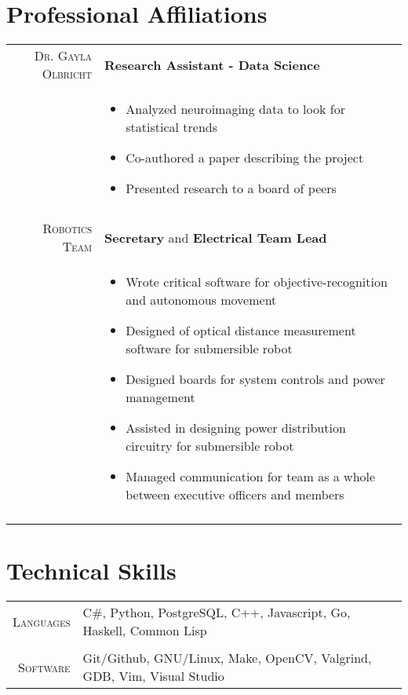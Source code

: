 \documentclass[a4paper,10pt]{article}
\newcommand{\br}{\\\multicolumn{2}{c}{}}
\begin{document}
\section{Professional Affiliations}
\begin{tabular}{r|p{15cm}}
    \textsc{Dr. Gayla Olbricht} & \textbf{Research Assistant - Data Science} \\
     & \begin{itemize}
    \item Analyzed neuroimaging data to look for statistical trends
    \item Co-authored a paper describing the project
    \item Presented research to a board of peers
    \end{itemize} \br\\

    \textsc{Robotics Team} & \textbf{Secretary} and \textbf{Electrical Team Lead} \\
     & \begin{itemize}
     \item Wrote critical software for objective-recognition and autonomous movement
     \item Designed of optical distance measurement software for submersible robot
     \item Designed boards for system controls and power management
     \item Assisted in designing power distribution circuitry for submersible robot
     \item Managed communication for team as a whole between executive officers and members
    \end{itemize} \br\\


\end{tabular}

\section{Technical Skills}
\begin{tabular}{r|p{15cm}}
    \textsc{\small Languages} &
    C\#,
    Python,
    PostgreSQL,
    C++,
    Javascript,
    Go,
    Haskell,
    Common Lisp\br\\

    \textsc{\small Software} &
    Git/Github,
    GNU/Linux,
    Make,
    OpenCV,
    Valgrind,
    GDB,
    Vim,
    Visual Studio
\end{tabular}
\end{document}
